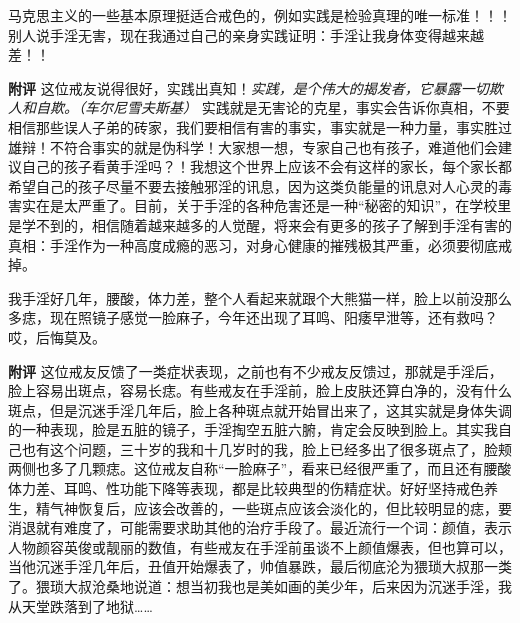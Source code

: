 \begin{case}
    马克思主义的一些基本原理挺适合戒色的，例如实践是检验真理的唯一标准！！！别人说手淫无害，现在我通过自己的亲身实践证明：手淫让我身体变得越来越差！！

    \textbf{附评} 这位戒友说得很好，实践出真知！\textit{实践，是个伟大的揭发者，它暴露一切欺人和自欺。（车尔尼雪夫斯基）} 实践就是无害论的克星，事实会告诉你真相，不要相信那些误人子弟的砖家，我们要相信有害的事实，事实就是一种力量，事实胜过雄辩！不符合事实的就是伪科学！大家想一想，专家自己也有孩子，难道他们会建议自己的孩子看黄手淫吗？！我想这个世界上应该不会有这样的家长，每个家长都希望自己的孩子尽量不要去接触邪淫的讯息，因为这类负能量的讯息对人心灵的毒害实在是太严重了。目前，关于手淫的各种危害还是一种“秘密的知识”，在学校里是学不到的，相信随着越来越多的人觉醒，将来会有更多的孩子了解到手淫有害的真相：手淫作为一种高度成瘾的恶习，对身心健康的摧残极其严重，必须要彻底戒掉。
\end{case}

\begin{case}
    我手淫好几年，腰酸，体力差，整个人看起来就跟个大熊猫一样，脸上以前没那么多痣，现在照镜子感觉一脸麻子，今年还出现了耳鸣、阳痿早泄等，还有救吗？哎，后悔莫及。

    \textbf{附评} 这位戒友反馈了一类症状表现，之前也有不少戒友反馈过，那就是手淫后，脸上容易出斑点，容易长痣。有些戒友在手淫前，脸上皮肤还算白净的，没有什么斑点，但是沉迷手淫几年后，脸上各种斑点就开始冒出来了，这其实就是身体失调的一种表现，脸是五脏的镜子，手淫掏空五脏六腑，肯定会反映到脸上。其实我自己也有这个问题，三十岁的我和十几岁时的我，脸上已经多出了很多斑点了，脸颊两侧也多了几颗痣。这位戒友自称“一脸麻子”，看来已经很严重了，而且还有腰酸体力差、耳鸣、性功能下降等表现，都是比较典型的伤精症状。好好坚持戒色养生，精气神恢复后，应该会改善的，一些斑点应该会淡化的，但比较明显的痣，要消退就有难度了，可能需要求助其他的治疗手段了。最近流行一个词：颜值，表示人物颜容英俊或靓丽的数值，有些戒友在手淫前虽谈不上颜值爆表，但也算可以，当他沉迷手淫几年后，丑值开始爆表了，帅值暴跌，最后彻底沦为猥琐大叔那一类了。猥琐大叔沧桑地说道：想当初我也是美如画的美少年，后来因为沉迷手淫，我从天堂跌落到了地狱……
\end{case}

